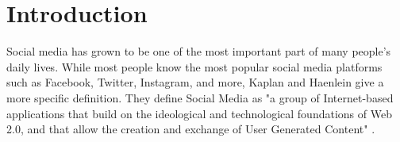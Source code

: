 \chapter{Introduction}
\label{cha:Chapter1_Introduction}

\iffalse

Total length: up to 5 Months = ~20 weeks oder
\selectlanguage{german}{

Abstract fertig machen, konkreter werden --> vor allem Methoden, kleiner Ansatz


Length: 1-2 pages
Inhaltsverzeichnis --> auch mehr Punkte

Methodology and Implementation --> kann man auch anders aufteilen
Motivation, Hintergrund

Warum diese Plattform --> einfache API

Auch aufpassen illegal

Wann schreiben? --> am Anfang, am Ende? Erstmal Entwurf am Ende
}
\selectlanguage{english}
%
%

\fi

Social media has grown to be one of the most important part of many people's daily lives. While most people know the most popular social media platforms such as Facebook, Twitter, Instagram, and more, Kaplan and Haenlein give a more specific definition. They define Social Media as "a group of Internet-based applications that build on the ideological and technological foundations of Web 2.0, and that allow the creation and exchange of User Generated Content" \cite[p.~61]{KAPLAN201059}. 

